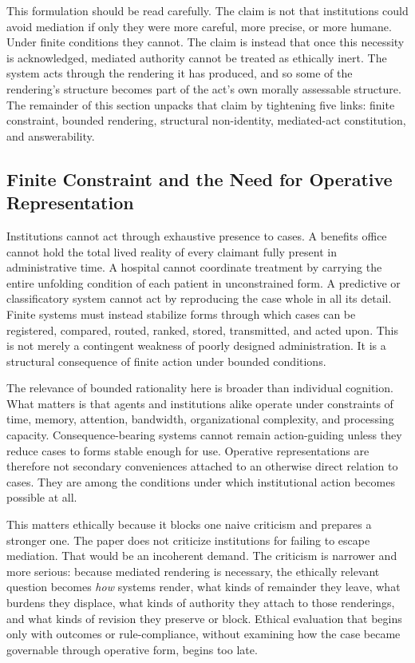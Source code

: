 \documentclass[11pt]{article}
\renewcommand{\emph}[1]{\textit{#1}}
\begin{document}
This formulation should be read carefully. The claim is not that institutions could avoid mediation if only they were more careful, more precise, or more humane. Under finite conditions they cannot. The claim is instead that once this necessity is acknowledged, mediated authority cannot be treated as ethically inert. The system acts through the rendering it has produced, and so some of the rendering's structure becomes part of the act's own morally assessable structure. The remainder of this section unpacks that claim by tightening five links: finite constraint, bounded rendering, structural non-identity, mediated-act constitution, and answerability.

\subsection{Finite Constraint and the Need for Operative Representation}

Institutions cannot act through exhaustive presence to cases. A benefits office cannot hold the total lived reality of every claimant fully present in administrative time. A hospital cannot coordinate treatment by carrying the entire unfolding condition of each patient in unconstrained form. A predictive or classificatory system cannot act by reproducing the case whole in all its detail. Finite systems must instead stabilize forms through which cases can be registered, compared, routed, ranked, stored, transmitted, and acted upon. This is not merely a contingent weakness of poorly designed administration. It is a structural consequence of finite action under bounded conditions. \cite{Wheeler2024BoundedRationalitySEP,Simon1982ModelsBoundedRationality,Swanson2026ConstraintConditionDisclosure}

The relevance of bounded rationality here is broader than individual cognition. What matters is that agents and institutions alike operate under constraints of time, memory, attention, bandwidth, organizational complexity, and processing capacity. Consequence-bearing systems cannot remain action-guiding unless they reduce cases to forms stable enough for use. Operative representations are therefore not secondary conveniences attached to an otherwise direct relation to cases. They are among the conditions under which institutional action becomes possible at all.

This matters ethically because it blocks one naive criticism and prepares a stronger one. The paper does not criticize institutions for failing to escape mediation. That would be an incoherent demand. The criticism is narrower and more serious: because mediated rendering is necessary, the ethically relevant question becomes \emph{how} systems render, what kinds of remainder they leave, what burdens they displace, what kinds of authority they attach to those renderings, and what kinds of revision they preserve or block. Ethical evaluation that begins only with outcomes or rule-compliance, without examining how the case became governable through operative form, begins too late.
\end{document}
